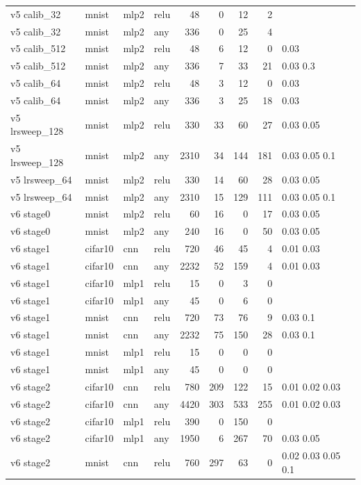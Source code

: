 \begin{table}[htbp]
{\begin{tabular}{@{}llllrrrrl@{}}
v5 calib\_32 & mnist & mlp2 & relu & 48 & 0 & 12 & 2 &  \\
v5 calib\_32 & mnist & mlp2 & any & 336 & 0 & 25 & 4 &  \\
v5 calib\_512 & mnist & mlp2 & relu & 48 & 6 & 12 & 0 & 0.03 \\
v5 calib\_512 & mnist & mlp2 & any & 336 & 7 & 33 & 21 & 0.03 0.3 \\
v5 calib\_64 & mnist & mlp2 & relu & 48 & 3 & 12 & 0 & 0.03 \\
v5 calib\_64 & mnist & mlp2 & any & 336 & 3 & 25 & 18 & 0.03 \\
v5 lrsweep\_128 & mnist & mlp2 & relu & 330 & 33 & 60 & 27 & 0.03 0.05 \\
v5 lrsweep\_128 & mnist & mlp2 & any & 2310 & 34 & 144 & 181 & 0.03 0.05 0.1 \\
v5 lrsweep\_64 & mnist & mlp2 & relu & 330 & 14 & 60 & 28 & 0.03 0.05 \\
v5 lrsweep\_64 & mnist & mlp2 & any & 2310 & 15 & 129 & 111 & 0.03 0.05 0.1 \\
v6 stage0 & mnist & mlp2 & relu & 60 & 16 & 0 & 17 & 0.03 0.05 \\
v6 stage0 & mnist & mlp2 & any & 240 & 16 & 0 & 50 & 0.03 0.05 \\
v6 stage1 & cifar10 & cnn & relu & 720 & 46 & 45 & 4 & 0.01 0.03 \\
v6 stage1 & cifar10 & cnn & any & 2232 & 52 & 159 & 4 & 0.01 0.03 \\
v6 stage1 & cifar10 & mlp1 & relu & 15 & 0 & 3 & 0 &  \\
v6 stage1 & cifar10 & mlp1 & any & 45 & 0 & 6 & 0 &  \\
v6 stage1 & mnist & cnn & relu & 720 & 73 & 76 & 9 & 0.03 0.1 \\
v6 stage1 & mnist & cnn & any & 2232 & 75 & 150 & 28 & 0.03 0.1 \\
v6 stage1 & mnist & mlp1 & relu & 15 & 0 & 0 & 0 &  \\
v6 stage1 & mnist & mlp1 & any & 45 & 0 & 0 & 0 &  \\
v6 stage2 & cifar10 & cnn & relu & 780 & 209 & 122 & 15 & 0.01 0.02 0.03 \\
v6 stage2 & cifar10 & cnn & any & 4420 & 303 & 533 & 255 & 0.01 0.02 0.03 \\
v6 stage2 & cifar10 & mlp1 & relu & 390 & 0 & 150 & 0 &  \\
v6 stage2 & cifar10 & mlp1 & any & 1950 & 6 & 267 & 70 & 0.03 0.05 \\
v6 stage2 & mnist & cnn & relu & 760 & 297 & 63 & 0 & 0.02 0.03 0.05 0.1 \\

\end{tabular}}
\end{table}
